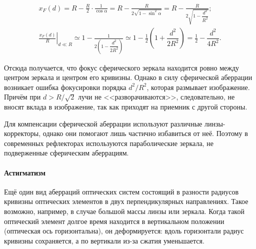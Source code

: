 \begin{gather*}
	x_F(d) = R - \frac{R}{2} \cdot \frac{1}{\cos\alpha} = R - \frac{R}{2\sqrt{1 - \sin^2 \alpha}}  = R  - \frac{R}{2\sqrt{1 - \dfrac{d^2}{R^2}}};\\
	\left. \frac{x_F(d)}{R} \right|_{d \ll R} \simeq  1  - \frac{1}{2\left(1 - \dfrac{d^2}{2R^2} \right)} \simeq  1 - \frac{1}{2}\left(1 + \dfrac{d^2}{2R^2} \right)  = \frac{1}{2} -  \dfrac{d^2}{4R^2}.
\end{gather*}
\begin{figure}
	\centering
	\vspace{-.5pc}
	\caption{}
\end{figure}
Отсюда получается, что фокус сферического зеркала находится ровно между центром зеркала и центром его кривизны. Однако в силу сферической аберрации возникает ошибка фокусировки порядка $d^2/R^2$, которая размывает изображение. Причём при $d > R/\sqrt{2}$ лучи не <<разворачиваются>>, следовательно, не вносят вклада в изображение, так как приходят на приемник с другой стороны.

Для компенсации сферической аберрации используют различные линзы-коррек\-торы, однако они помогают лишь частично избавиться от неё. Поэтому в современных рефлекторах используются параболические зеркала, не подверженные сферическим аберрациям.


\paragraph{Астигматизм} Ещё один вид аберраций оптических систем состоящий в разности радиусов кривизны оптических элементов в двух перпендикулярных направлениях. Такое возможно, например, в случае большой массы линзы или зеркала. Когда такой оптический элемент долгое время находится в вертикальном положении (оптическая ось горизонтальна), он деформируется: вдоль горизонтали радиус кривизны сохраняется, а по вертикали из-за сжатия уменьшается.

